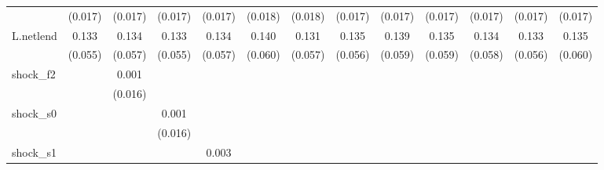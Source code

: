 {\begin{tabular}{l*{12}{c}}
            &     (0.017)         &     (0.017)         &     (0.017)         &     (0.017)         &     (0.018)         &     (0.018)         &     (0.017)         &     (0.017)         &     (0.017)         &     (0.017)         &     (0.017)         &     (0.017)         \\
\addlinespace
L.netlend   &       0.133\sym{**} &       0.134\sym{**} &       0.133\sym{**} &       0.134\sym{**} &       0.140\sym{**} &       0.131\sym{**} &       0.135\sym{**} &       0.139\sym{**} &       0.135\sym{**} &       0.134\sym{**} &       0.133\sym{**} &       0.135\sym{**} \\
            &     (0.055)         &     (0.057)         &     (0.055)         &     (0.057)         &     (0.060)         &     (0.057)         &     (0.056)         &     (0.059)         &     (0.059)         &     (0.058)         &     (0.056)         &     (0.060)         \\
\addlinespace
shock\_f2    &                     &       0.001         &                     &                     &                     &                     &                     &                     &                     &                     &                     &                     \\
            &                     &     (0.016)         &                     &                     &                     &                     &                     &                     &                     &                     &                     &                     \\
\addlinespace
shock\_s0    &                     &                     &       0.001         &                     &                     &                     &                     &                     &                     &                     &                     &                     \\
            &                     &                     &     (0.016)         &                     &                     &                     &                     &                     &                     &                     &                     &                     \\
\addlinespace
shock\_s1    &                     &                     &                     &       0.003         &                     &                     &                     &                     &                     &                     &                     &                     \\

\end{tabular}}
